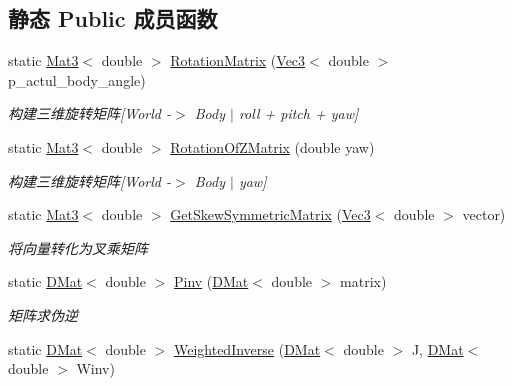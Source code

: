 \subsection*{静态 Public 成员函数}
\begin{DoxyCompactItemize}
\item 
static \hyperlink{cppTypes_8h_adb7d462b35d31f0b2583b3e230a2a2c3}{Mat3}$<$ double $>$ \hyperlink{classquadruped_1_1Common_a471c7074d56b4a2c856ff21e680e67a8}{Rotation\+Matrix} (\hyperlink{cppTypes_8h_a65c27bf97693676535dd0b30ea0ad399}{Vec3}$<$ double $>$ p\+\_\+actul\+\_\+body\+\_\+angle)
\begin{DoxyCompactList}\small\item\em 构建三维旋转矩阵\mbox{[}World -\/$>$ Body $\vert$ roll + pitch + yaw\mbox{]} \end{DoxyCompactList}\item 
static \hyperlink{cppTypes_8h_adb7d462b35d31f0b2583b3e230a2a2c3}{Mat3}$<$ double $>$ \hyperlink{classquadruped_1_1Common_aa0a116c7c23dea6de2cd2dcd28b644b6}{Rotation\+Of\+Z\+Matrix} (double yaw)
\begin{DoxyCompactList}\small\item\em 构建三维旋转矩阵\mbox{[}World -\/$>$ Body $\vert$ yaw\mbox{]} \end{DoxyCompactList}\item 
static \hyperlink{cppTypes_8h_adb7d462b35d31f0b2583b3e230a2a2c3}{Mat3}$<$ double $>$ \hyperlink{classquadruped_1_1Common_a8b05a953662bcadd1cd3bf7dd17ae866}{Get\+Skew\+Symmetric\+Matrix} (\hyperlink{cppTypes_8h_a65c27bf97693676535dd0b30ea0ad399}{Vec3}$<$ double $>$ vector)
\begin{DoxyCompactList}\small\item\em 将向量转化为叉乘矩阵 \end{DoxyCompactList}\item 
static \hyperlink{cppTypes_8h_a5db6bfb25afa103db1fb6bb6287ae9d7}{D\+Mat}$<$ double $>$ \hyperlink{classquadruped_1_1Common_a972d5fc8430f5aa57706d0a7f0cc267e}{Pinv} (\hyperlink{cppTypes_8h_a5db6bfb25afa103db1fb6bb6287ae9d7}{D\+Mat}$<$ double $>$ matrix)
\begin{DoxyCompactList}\small\item\em 矩阵求伪逆 \end{DoxyCompactList}\item 
static \hyperlink{cppTypes_8h_a5db6bfb25afa103db1fb6bb6287ae9d7}{D\+Mat}$<$ double $>$ \hyperlink{classquadruped_1_1Common_a0b5411a1c977d54a3f2cf88ab7662c1c}{Weighted\+Inverse} (\hyperlink{cppTypes_8h_a5db6bfb25afa103db1fb6bb6287ae9d7}{D\+Mat}$<$ double $>$ J, \hyperlink{cppTypes_8h_a5db6bfb25afa103db1fb6bb6287ae9d7}{D\+Mat}$<$ double $>$ Winv)
\end{DoxyCompactItemize}


